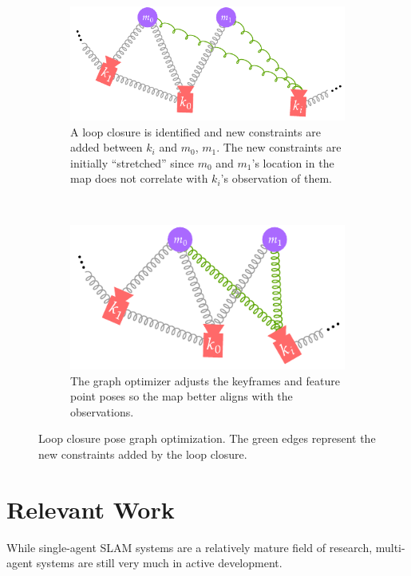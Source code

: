 \begin{figure}[h]
    \centering
    \begin{subfigure}[t]{0.54\textwidth}
        \centering
        \includegraphics[width=\textwidth]{figures/gpo_loop_closure_1.pdf}
        \caption{A loop closure is identified and new constraints are added between $k_i$ and $m_0$, $m_1$. The new constraints are initially ``stretched'' since $m_0$ and $m_1$'s location in the map does not correlate with $k_i$'s observation of them.}
    \end{subfigure}\hfill%
    ~
    \begin{subfigure}[t]{0.43\textwidth}
        \centering
        \includegraphics[width=\textwidth]{figures/gpo_loop_closure_2.pdf}
        \caption{The graph optimizer adjusts the keyframes and feature point poses so the map better aligns with the observations.}
    \end{subfigure}%
    \caption{Loop closure pose graph optimization. The green edges represent the new constraints added by the loop closure.}
    \label{fig:gpo-loop-closure}
\end{figure}


\section{Relevant Work}
\label{sec:relevant-work}
While single-agent SLAM systems are a relatively mature field of research, multi-agent systems are still very much in active development.

